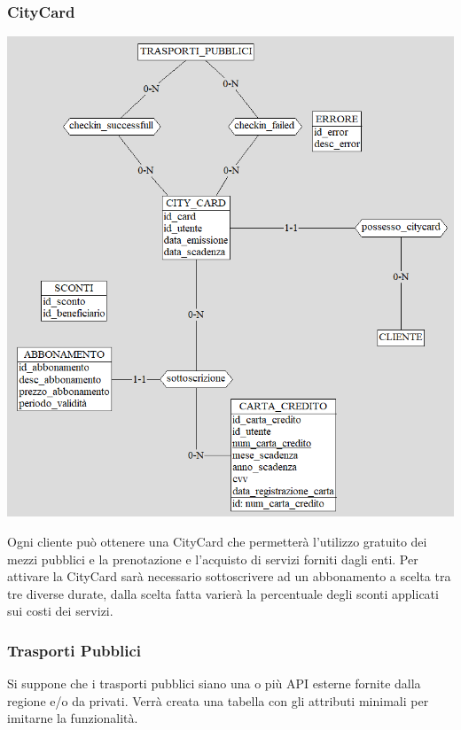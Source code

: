 \subsubsection{CityCard}
\begin{center}
\includegraphics[width=0.95\columnwidth]{images/CityCard.png}
\end{center}
Ogni cliente può ottenere una CityCard che permetterà l'utilizzo gratuito dei mezzi pubblici e la prenotazione e l'acquisto di servizi forniti dagli enti. Per attivare la CityCard sarà necessario sottoscrivere ad un abbonamento a scelta tra tre diverse durate, dalla scelta fatta varierà la percentuale degli sconti applicati sui costi dei servizi.

\subsubsection{Trasporti Pubblici}
Si suppone che i trasporti pubblici siano una o più API esterne fornite dalla regione e/o da privati. Verrà creata una tabella con gli attributi minimali per imitarne la funzionalità. 


